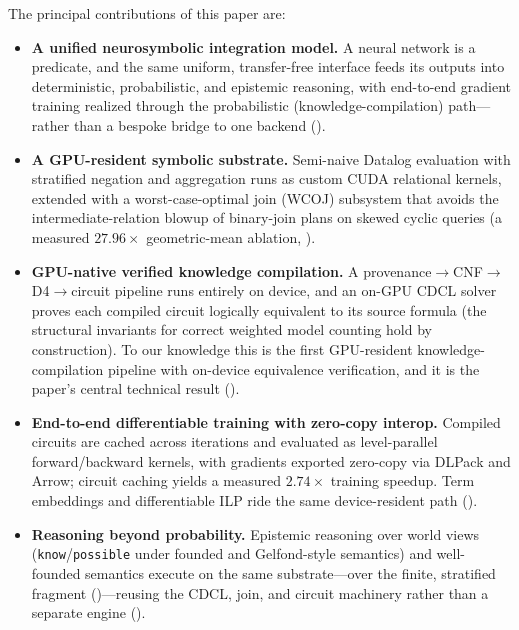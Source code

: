 The principal contributions of this paper are:

\begin{itemize}
  \item \textbf{A unified neurosymbolic integration model.} A neural network is a predicate, and the same uniform, transfer-free interface feeds its outputs into deterministic, probabilistic, and epistemic reasoning, with end-to-end gradient training realized through the probabilistic (knowledge-compilation) path---rather than a bespoke bridge to one backend ().
  \item \textbf{A GPU-resident symbolic substrate.} Semi-naive Datalog evaluation with stratified negation and aggregation runs as custom CUDA relational kernels, extended with a worst-case-optimal join (WCOJ) subsystem that avoids the intermediate-relation blowup of binary-join plans on skewed cyclic queries (a measured $27.96\times$ geometric-mean ablation, ).
  \item \textbf{GPU-native verified knowledge compilation.} A provenance$\to$CNF$\to$D4$\to$circuit pipeline runs entirely on device, and an on-GPU CDCL solver proves each compiled circuit logically equivalent to its source formula (the structural invariants for correct weighted model counting hold by construction). To our knowledge this is the first GPU-resident knowledge-compilation pipeline with on-device equivalence verification, and it is the paper's central technical result ().
  \item \textbf{End-to-end differentiable training with zero-copy interop.} Compiled circuits are cached across iterations and evaluated as level-parallel forward/backward kernels, with gradients exported zero-copy via DLPack and Arrow; circuit caching yields a measured $2.74\times$ training speedup. Term embeddings and differentiable ILP ride the same device-resident path ().
  \item \textbf{Reasoning beyond probability.} Epistemic reasoning over world views (\texttt{know}/\texttt{possible} under founded and Gelfond-style semantics) and well-founded semantics execute on the same substrate---over the finite, stratified fragment ()---reusing the CDCL, join, and circuit machinery rather than a separate engine ().
\end{itemize}

